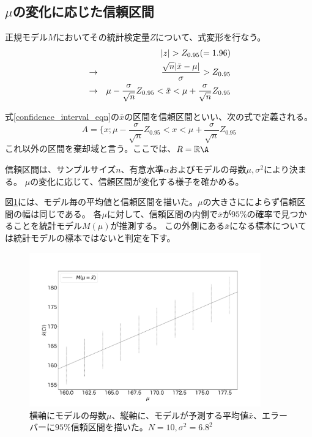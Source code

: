 \subsection{$\mu$の変化に応じた信頼区間}
正規モデル$M$においてその統計検定量$Z$について、式変形を行なう。
\begin{eqnarray}
    & &|z| > Z_{0.95}( = 1.96 ) \notag \\
    &\rightarrow& \frac{\sqrt{n}|\bar{x}-\mu|}{\sigma} > Z_{0.95} \notag\\
    &\rightarrow& \mu-\frac{\sigma}{\sqrt{n}}Z_{0.95} < \bar{x} < \mu+\frac{\sigma}{\sqrt{n}}Z_{0.95} \label{confidence_interval_eqn}
\end{eqnarray}
\begin{defi}
式\eqref{confidence_interval_eqn}の$\bar{x}$の区間を信頼区間といい、次の式で定義される。
\begin{equation*}
    A=\{x;\mu-\frac{\sigma}{\sqrt{n}}Z_{0.95} < x < \mu+\frac{\sigma}{\sqrt{n}}Z_{0.95}
\end{equation*}
これ以外の区間を棄却域と言う。ここでは、$R=\mathbb{R}\A$
\end{defi}

信頼区間は、サンプルサイズ$n$、有意水準$\alpha$およびモデルの母数$\mu,\sigma^2$により決まる。
$\mu$の変化に応じて、信頼区間が変化する様子を確かめる。

図\ref{fig:confidence_interval_model}には、モデル毎の平均値と信頼区間を描いた。$\mu$の大きさにによらず信頼区間の幅は同じである。
各$\mu$に対して、信頼区間の内側で$\bar{x}$が$95\%$の確率で見つかることを統計モデル$M(\mu)$が推測する。
この外側にある$\bar{x}$になる標本については統計モデルの標本ではないと判定を下す。

\begin{figure}
    \begin{center}
        \includegraphics[width=10cm]{./image/04_/confidence_interval_model.pdf}
        \caption{横軸にモデルの母数$\mu$、縦軸に、モデルが予測する平均値$\bar{x}$、エラーバーに$95\%$信頼区間を描いた。$N=10,\sigma^2=6.8^2$}
        \label{fig:confidence_interval_model}

    \end{center}
\end{figure}



